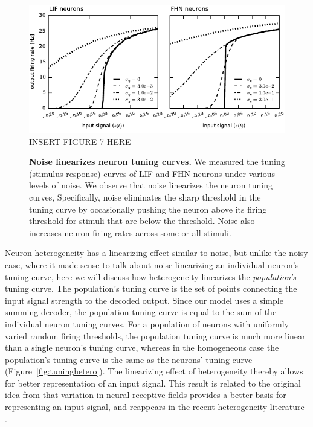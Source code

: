 \documentclass[letterpaper,11pt]{article}
\begin{document}
\begin{figure}
  \ifx\hidefigures\undefined
    \centering
    \includegraphics[width=\textwidth]{figure7_tuningnoisy.pdf}
  \else
    INSERT FIGURE 7 HERE
  \fi
  \caption{
    \textbf{Noise linearizes neuron tuning curves.}
    We measured the tuning (stimulus-response) curves of LIF and FHN neurons under various levels of noise.
    We observe that noise linearizes the neuron tuning curves,
    Specifically, noise eliminates the sharp threshold in the tuning curve by
    occasionally pushing the neuron above its firing threshold
    for stimuli that are below the threshold.
    Noise also increases neuron firing rates across some or all stimuli.
  }
  \label{fig:tuning}
\end{figure}

Neuron heterogeneity has a linearizing effect similar to noise,
but unlike the noisy case,
where it made sense to talk about noise
linearizing an individual neuron's tuning curve,
here we will discuss how heterogeneity
linearizes the \emph{population's} tuning curve.
The population's tuning curve is the set of points
connecting the input signal strength to the decoded output.
Since our model uses a simple summing decoder,
the population tuning curve is equal to
the sum of the individual neuron tuning curves.
For a population of neurons with uniformly varied random firing thresholds,
the population tuning curve is much more linear
than a single neuron's tuning curve,
whereas in the homogeneous case the population's tuning curve
is the same as the neurons' tuning curve (Figure~\ref{fig:tuninghetero}).
The linearizing effect of heterogeneity
thereby allows for better representation of an input signal.
This result is related to the original idea from \cite{Hubel1962}
that variation in neural receptive fields
provides a better basis for representing an input signal,
and reappears in the recent heterogeneity literature \citep{Angelo2012}.
\end{document}

